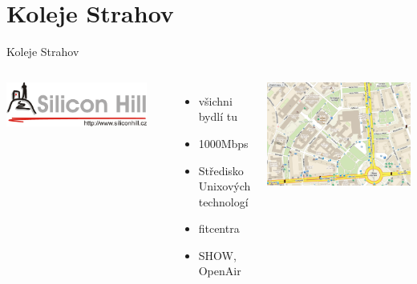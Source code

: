 \documentclass{beamer}
\begin{document}
\section{Koleje Strahov}
\begin{frame}{Koleje Strahov}
	\begin{columns}[c]
			\begin{center}
				\includegraphics[width=0.9\textwidth]{logo_sh.png}
			\end{center}

			\begin{itemize}
				\item všichni bydlí tu
				\item 1000Mbps
				\item Středisko Unixových technologí
				\item fitcentra
				\item SHOW, OpenAir
			\end{itemize}
			\begin{center}
				\includegraphics[width=\textwidth]{mapa_all.png}
			\end{center}
	\end{columns}

\end{frame}
\end{document}
